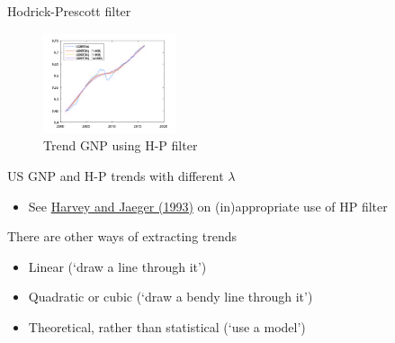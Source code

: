 
\begin{frame}{Hodrick-Prescott filter}

\begin{figure}
\caption[HP Trends]{Trend GNP using H-P filter}
\centering
\label{fig:gnp_different_hp}
\includegraphics[width=0.35\textwidth]{Figures/gnp_different_hp.JPG}
\end{figure}

US GNP and H-P trends with different $\lambda$
\begin{itemize}
	\item	See \href{https://onlinelibrary.wiley.com/doi/abs/10.1002/jae.3950080302}{Harvey and Jaeger (1993)} on (in)appropriate use of HP filter
\end{itemize}
There are other ways of extracting trends
	\begin{itemize}
	\item	Linear (`draw a line through it')
	\item	Quadratic or cubic (`draw a bendy line through it')
	\item	Theoretical, rather than statistical (`use a model')
	\end{itemize}

\end{frame}


